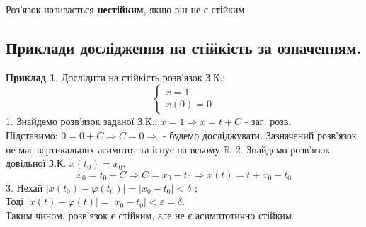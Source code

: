\documentclass[14pt,a4paper]{scrartcl}
\theoremstyle{definition}
\newtheorem*{example}{Приклад}
\theoremstyle{remark}
\theoremstyle{definition}
\theoremstyle{definition}
\begin{document}
Роз'язок називається \textbf{нестійким}, якщо він не є стійким.
\ed

\subsection{Приклади дослідження на стійкість за означенням.}

\begin{example}
    Дослідити на стійкість розв'язок З.К.:
$$
\begin{cases}
    x = 1 \\
    x(0) = 0
\end{cases}
$$
1. Знайдемо розв'язок заданої З.К.: $x = 1 \Rightarrow x = t + C$ - заг. розв.\\
Підставимо: $ 0 = 0 + C \Longrightarrow C = 0 \Longrightarrow $  - будемо досліджувати.
Зазначений розв'язок не має вертикальних асимптот та існує на всьому $\mathbb{R}$.
2. Знайдемо розв'язок довільної З.К. $x(t_0) = x_0$.
$$
x_0 = t_0 + C \Rightarrow C = x_0 - t_0 \Rightarrow x(t) = t + x_0 - t_0
$$
3. Нехай $  \left| x(t_0) - \varphi(t_0) \right|  =  \left| x_0 - t_0 \right| < \delta  $ ;\\
Тоді $ \left| x (t) - \varphi (t) \right|  = \left|  x_0 - t_0 \right| < \varepsilon = \delta $.\\
Таким чином, розв'язок є стійким, але не є асимптотично стійким.

\end{example}
\end{document}
